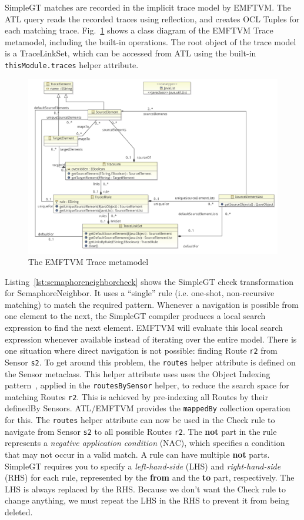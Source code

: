 \documentclass[submission,copyright,creativecommons]{eptcs}
\begin{document}
SimpleGT matches are recorded in the implicit trace model by EMFTVM. The ATL query reads the recorded traces using reflection, and creates OCL Tuples for each matching trace. Fig.~\ref{fig:emftvm-trace} shows a class diagram of the EMFTVM Trace metamodel, including the built-in operations. The root object of the trace model is a TraceLinkSet, which can be accessed from ATL using the built-in \texttt{thisModule.traces} helper attribute.

\begin{figure}[ht]
\centerline{
\includegraphics[width=15cm]{figures/trace}}
\caption{The EMFTVM Trace metamodel}
\label{fig:emftvm-trace}
\end{figure}

Listing~\ref{lst:semaphoreneighborcheck} shows the SimpleGT check transformation for SemaphoreNeighbor. It uses a ``single'' rule (i.e. one-shot, non-recursive matching) to match the required pattern. Whenever a navigation is possible from one element to the next, the SimpleGT compiler produces a local search expression to find the next element. EMFTVM will evaluate this local search expression whenever available instead of iterating over the entire model. There is one situation where direct navigation is not possible: finding Route \texttt{r2} from Sensor \texttt{s2}. To get around this problem, the \texttt{routes} helper attribute is defined on the Sensor metaclass. This helper attribute uses uses the Object Indexing pattern~\cite{conf/icsea/Lano2011}, applied in the \texttt{routesBySensor} helper, to reduce the search space for matching Routes \texttt{r2}. This is achieved by pre-indexing all Routes by their definedBy Sensors. ATL/EMFTVM provides the \texttt{mappedBy} collection operation for this. The \texttt{routes} helper attribute can now be used in the Check rule to navigate from Sensor \texttt{s2} to all possible Routes \texttt{r2}. The \textbf{not} part in the rule represents a \emph{negative application condition} (NAC), which specifies a condition that may not occur in a valid match. A rule can have multiple \textbf{not} parts. SimpleGT requires you to specify a \emph{left-hand-side} (LHS) and \emph{right-hand-side} (RHS) for each rule, represented by the \textbf{from} and the \textbf{to} part, respectively. The LHS is always replaced by the RHS. Because we don't want the Check rule to change anything, we must repeat the LHS in the RHS to prevent it from being deleted.
\end{document}
